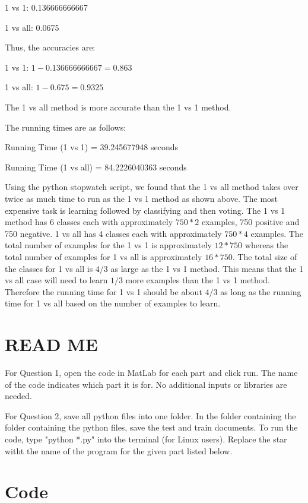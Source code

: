 \documentclass[12pt]{article}
\begin{document}
\begin{enumerate}
1 vs 1:	0.136666666667

1 vs all: 	0.0675

Thus, the accuracies are:

1 vs 1: $1-0.136666666667 = 0.863$

1 vs all: $1-0.675 = 0.9325$

The 1 vs all method is more accurate than the 1 vs 1 method.


The running times are as follows:

Running Time (1 vs 1) = 39.245677948 seconds

Running Time (1 vs all) = 84.2226040363 seconds

Using the python stopwatch script, we found that the 1 vs all method takes over twice as much time to run as the 1 vs 1 method as shown above. The most expensive task is learning followed by classifying and then voting. The 1 vs 1 method has 6 classes each with approximately $750*2$ examples, 750 positive and 750 negative. 1 vs all has 4 classes each with approximately $750*4$ examples. The total number of examples for the 1 vs 1 is approximately $12*750$ whereas the total number of examples for 1 vs all is approximately $16*750$. The total size of the classes for 1 vs all is $4/3$ as large as the 1 vs 1 method. This means that the 1 vs all case will need to learn $1/3$ more examples than the 1 vs 1 method. Therefore the running time for 1 vs 1 should be about $4/3$ as long as the running time for 1 vs all based on the number of examples to learn.


\end{enumerate}
\section{READ ME}


For Question 1, open the code in MatLab for each part and click run. The name of the code indicates which part it is for. No additional inputs or libraries are needed.

For Question 2, save all python files into one folder. In the folder containing the folder containing the python files, save the test and train documents. To run the code, type "python *.py" into the terminal (for Linux users). Replace the star witht the name of the program for the given part listed below.


\section{Code}
\end{document}
